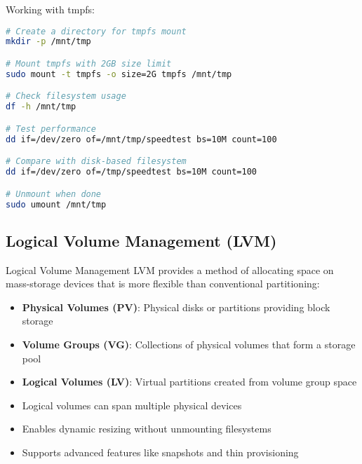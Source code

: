 \begin{example}
    Working with tmpfs:
    
\begin{lstlisting}[language=bash, style=basesmol]
# Create a directory for tmpfs mount
mkdir -p /mnt/tmp

# Mount tmpfs with 2GB size limit
sudo mount -t tmpfs -o size=2G tmpfs /mnt/tmp

# Check filesystem usage
df -h /mnt/tmp

# Test performance
dd if=/dev/zero of=/mnt/tmp/speedtest bs=10M count=100

# Compare with disk-based filesystem
dd if=/dev/zero of=/tmp/speedtest bs=10M count=100

# Unmount when done
sudo umount /mnt/tmp
\end{lstlisting}
\end{example}

\subsection{Logical Volume Management (LVM)}

\begin{definition}{Logical Volume Management}
    LVM provides a method of allocating space on mass-storage devices that is more flexible than conventional partitioning:
    \begin{itemize}
        \item \textbf{Physical Volumes (PV)}: Physical disks or partitions providing block storage
        \item \textbf{Volume Groups (VG)}: Collections of physical volumes that form a storage pool
        \item \textbf{Logical Volumes (LV)}: Virtual partitions created from volume group space
        \item Logical volumes can span multiple physical devices
        \item Enables dynamic resizing without unmounting filesystems
        \item Supports advanced features like snapshots and thin provisioning
    \end{itemize}
\end{definition}

